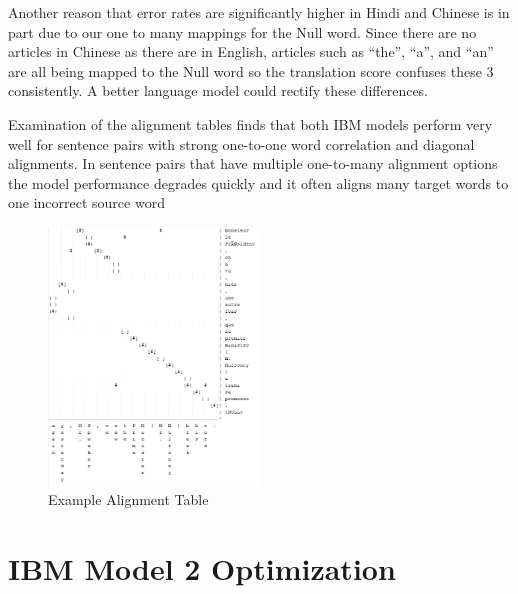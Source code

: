 \documentclass{article}
\begin{document}
Another reason that error rates are significantly higher in Hindi and Chinese is in part due to our one to many mappings for the Null word. Since there are no articles in Chinese as there are in English, articles such as “the”, “a”, and “an” are all being mapped to the Null word so the translation score confuses these 3 consistently. A better language model could rectify these differences. 

Examination of the alignment tables finds that both IBM models perform very well for sentence pairs with strong one-to-one word correlation and diagonal alignments. In sentence pairs that have multiple one-to-many alignment options the model performance degrades quickly and it often aligns many target words to one incorrect source word
\begin{center}
\begin{figure}[h]
\caption{Example Alignment Table}
\centering
\includegraphics[width=0.5\textwidth]{alignment_table}
\end{figure}
\end{center}
\section*{IBM Model 2 Optimization}
\end{document}
